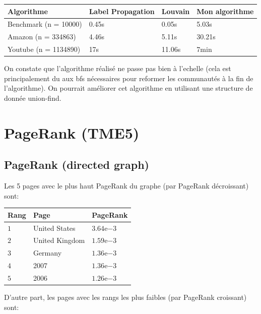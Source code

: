 \documentclass{report}
\begin{document}
\begin{center}
  \begin{tabular}{|l|l|l|l|}
    \hline
    Algorithme & Label Propagation & Louvain & Mon algorithme\\
    \hline
    Benchmark (n = 10000) & 0.45s & 0.05s & 5.03s\\
    Amazon (n = 334863) & 4.46s & 5.11s & 30.21s\\
    Youtube (n = 1134890) & 17s & 11.06s & 7min\\
    \hline
  \end{tabular}
\end{center}

On constate que l'algorithme réalisé ne passe pas bien à l'echelle (cela est principalement du aux bfs nécessaires pour reformer les communautés à la fin de l'algorithme). On pourrait améliorer cet algorithme en utilisant une structure de donnée union-find.

\chapter{PageRank (TME5)}

\section{PageRank (directed graph)}

Les 5 pages avec le plus haut PageRank du graphe (par PageRank décroissant) sont:

\begin{center}
  \begin{tabular}{|l|l|l|}
    \hline
    Rang & Page & PageRank\\
    \hline
    $1$ & United States & $3.64\mathrm{e}{-3}$\\
    $2$ & United Kingdom & $1.59\mathrm{e}{-3}$\\
    $3$ & Germany & $1.36\mathrm{e}{-3}$\\
    $4$ & 2007 & $1.36\mathrm{e}{-3}$\\
    $5$ & 2006 & $1.26\mathrm{e}{-3}$\\
    \hline
  \end{tabular}
\end{center}

D'autre part, les pages avec les rangs les plus faibles (par PageRank croissant) sont:
\end{document}
